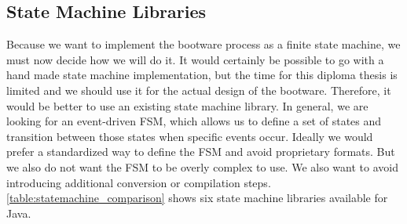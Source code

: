 \subsection{State Machine Libraries}
\label{implementation:selecting:statemachine}

Because we want to implement the bootware process as a finite state machine, we must now decide how we will do it.
It would certainly be possible to go with a hand made state machine implementation, but the time for this diploma thesis is limited and we should use it for the actual design of the bootware.
Therefore, it would be better to use an existing state machine library.
In general, we are looking for an event-driven FSM, which allows us to define a set of states and transition between those states when specific events occur.
Ideally we would prefer a standardized way to define the FSM and avoid proprietary formats.
But we also do not want the FSM to be overly complex to use.
We also want to avoid introducing additional conversion or compilation steps.
\autoref{table:statemachine_comparison} shows six state machine libraries available for Java.


